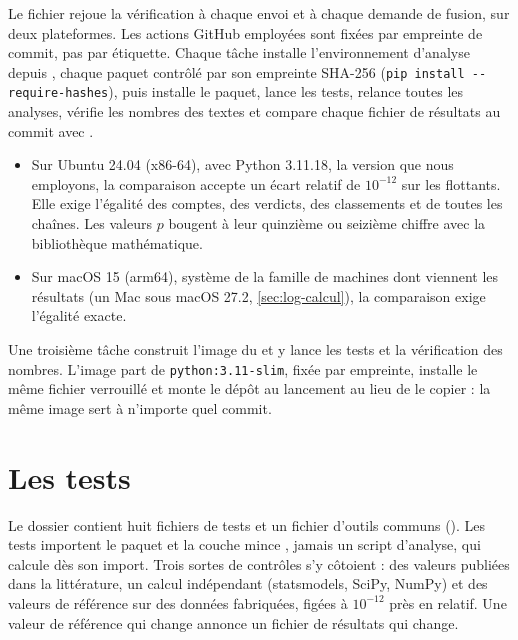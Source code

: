 Le fichier  rejoue la vérification à chaque envoi et à chaque
demande de fusion, sur deux plateformes. Les actions GitHub employées sont fixées par empreinte de
commit, pas par étiquette. Chaque tâche installe l'environnement d'analyse depuis
, chaque paquet contrôlé par son empreinte SHA-256
(\texttt{pip install -{}-require-hashes}), puis installe le paquet, lance les tests, relance toutes
les analyses, vérifie les nombres des textes et compare chaque fichier de résultats au commit avec
.
\begin{itemize}
  \item Sur Ubuntu 24.04 (x86-64), avec Python 3.11.18, la version que nous employons, la
        comparaison accepte un écart relatif de $10^{-12}$ sur les flottants. Elle exige l'égalité
        des comptes, des verdicts, des classements et de toutes les chaînes. Les valeurs $p$ bougent à leur
        quinzième ou seizième chiffre avec la bibliothèque mathématique.
  \item Sur macOS 15 (arm64), système de la famille de machines dont viennent les résultats (un Mac
        sous macOS 27.2, \cref{sec:log-calcul}), la comparaison exige l'égalité exacte.
\end{itemize}
Une troisième tâche construit l'image du  et y lance les tests et la vérification
des nombres. L'image part de \texttt{python:3.11-slim}, fixée par empreinte, installe le même
fichier verrouillé et monte le dépôt au lancement au lieu de le copier : la même image sert à
n'importe quel commit.

\section{Les tests}
\label{sec:tests}

Le dossier  contient huit fichiers de tests et un fichier d'outils communs
(). Les tests importent le paquet et la couche mince
, jamais un script d'analyse, qui calcule dès son import. Trois sortes de
contrôles s'y côtoient : des valeurs publiées dans la littérature, un calcul indépendant
(statsmodels, SciPy, NumPy) et des valeurs de référence sur des données fabriquées, figées à
$10^{-12}$ près en relatif. Une valeur de référence qui change annonce un fichier de résultats qui
change.

